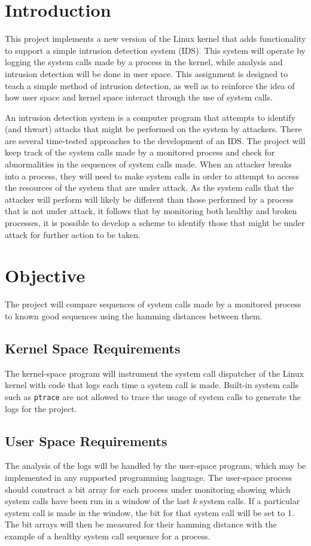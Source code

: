 %
%
%

\section{Introduction} This project implements a new version of the Linux
kernel that adds functionality to support a simple intrusion detection
system (IDS). This system will operate by logging the system calls made by
a process in the kernel, while analysis and intrusion detection will be
done in user space. This assignment is designed to teach a simple method of
intrusion detection, as well as to reinforce the idea of how user space and
kernel space interact through the use of system calls.

An intrusion detection system is a computer program that attempts to
identify (and thwart) attacks that might be performed on the system by
attackers. There are several time-tested approaches to the development of
an IDS. The project will keep track of the system calls made by a monitored
process and check for abnormalities in the sequences of system calls made.
When an attacker breaks into a process, they will need to make system calls
in order to attempt to access the resources of the system that are under
attack. As the system calls that the attacker will perform will likely be
different than those performed by a process that is not under attack, it
follows that by monitoring both healthy and broken processes, it is
possible to develop a scheme to identify those that might be under attack
for further action to be taken.

\section{Objective} The project will compare sequences of system calls made
by a monitored process to known good sequences using the hamming distances
between them.

\subsection{Kernel Space Requirements} The kernel-space program will
instrument the system call dispatcher of the Linux kernel with code that
logs each time a system call is made. Built-in system calls such as
\texttt{ptrace} are not allowed to trace the usage of system calls to
generate the logs for the project.

\subsection{User Space Requirements} The analysis of the logs will be
handled by the user-space program, which may be implemented in any
supported programming language. The user-space process should construct a
bit array for each process under monitoring showing which system calls have
been run in a window of the last $k$ system calls. If a particular system
call is made in the window, the bit for that system call will be set to 1.
The bit arrays will then be measured for their hamming distance with the
example of a healthy system call sequence for a process.
